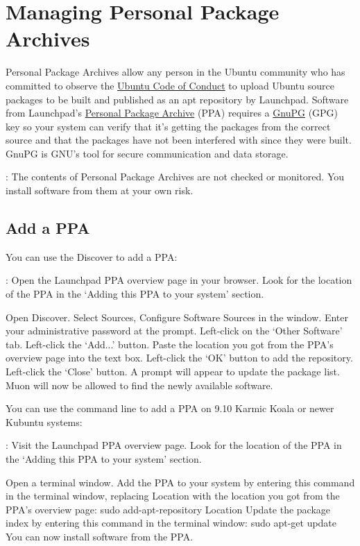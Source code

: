 \documentclass[letterpaper,10pt,english]{sphinxmanual}
\begin{document}
\section{Managing Personal Package Archives}
\label{\detokenize{docs/repositories:managing-personal-package-archives}}
Personal Package Archives allow any person in the Ubuntu community who has committed to observe the \href{https://launchpad.net/codeofconduct}{Ubuntu Code of Conduct} to upload Ubuntu source packages to be built and published as an apt repository by Launchpad. Software from Launchpad's \href{https://launchpad.net/ubuntu/+ppas}{Personal Package Archive} (PPA) requires a \href{https://www.gnupg.org/}{GnuPG} (GPG) key so your system can verify that it's getting the packages from the correct source and that the packages have not been interfered with since they were built. GnuPG is GNU's tool for secure communication and data storage.

: The contents of Personal Package Archives are not checked or monitored. You install software from them at your own risk.


\subsection{Add a PPA}
\label{\detokenize{docs/repositories:add-a-ppa}}
You can use the Discover to add a PPA:

: Open the Launchpad PPA overview page in your browser. Look for the location of the PPA in the `Adding this PPA to your system' section.

Open Discover. Select Sources, Configure Software Sources in the window. Enter your administrative password at the prompt. Left-click on the `Other Software' tab. Left-click the `Add...' button. Paste the location you got from the PPA's overview page into the text box. Left-click the `OK' button to add the repository. Left-click the `Close' button. A prompt will appear to update the package list. Muon will now be allowed to find the newly available software.

You can use the command line to add a PPA on 9.10 Karmic Koala or newer Kubuntu systems:

: Visit the Launchpad PPA overview page. Look for the location of the PPA in the `Adding this PPA to your system' section.

Open a terminal window. Add the PPA to your system by entering this command in the terminal window, replacing Location with the location you got from the PPA's overview page: sudo add-apt-repository Location Update the package index by entering this command in the terminal window: sudo apt-get update You can now install software from the PPA.
\end{document}
